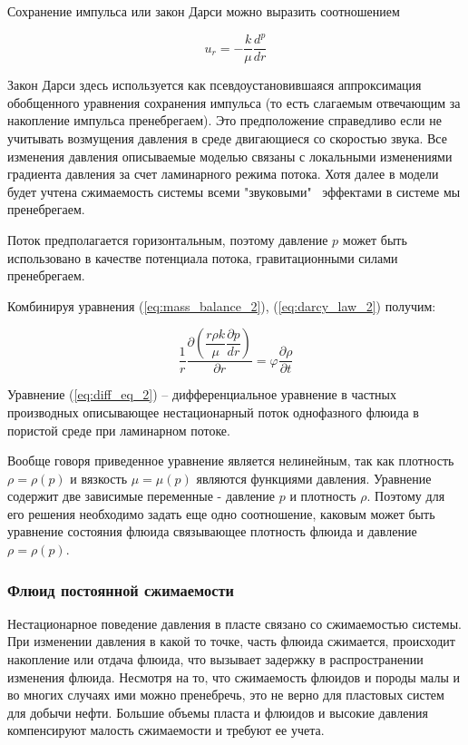 Сохранение импульса или закон Дарси можно выразить соотношением  


\begin{equation} \label{eq:darcy_law_2}
 u_r=-\frac{k}{\mu}\frac{d^p}{dr}
\end{equation}

Закон Дарси здесь используется как псевдоустановившаяся аппроксимация обобщенного уравнения сохранения импульса (то есть слагаемым отвечающим за накопление импульса пренебрегаем). Это предположение справедливо если не учитывать возмущения давления в среде двигающиеся со скоростью звука. Все изменения давления описываемые моделью связаны с локальными изменениями градиента давления за счет ламинарного режима потока. Хотя далее в модели будет учтена сжимаемость системы всеми "звуковыми" \ эффектами в системе мы пренебрегаем.

Поток предполагается горизонтальным, поэтому давление \( p\) может быть использовано в качестве потенциала потока, гравитационными силами пренебрегаем.

Комбинируя уравнения (\ref{eq:mass_balance_2}), (\ref{eq:darcy_law_2})  получим:

\begin{equation} \label{eq:diff_eq_2}
\frac{1}{r}\frac{\partial\left( \dfrac{r\rho k}{\mu}\dfrac{\partial p}{dr}\right)}{\partial r}=\varphi\frac{\partial \rho}{\partial t}
\end{equation}

Уравнение (\ref{eq:diff_eq_2}) -- дифференциальное уравнение в частных производных описывающее нестационарный поток однофазного флюида в пористой среде при ламинарном потоке. 

Вообще говоря приведенное уравнение является нелинейным, так как плотность $\rho = \rho(p)$ и вязкость $\mu = \mu(p)$ являются функциями давления. Уравнение содержит две зависимые переменные - давление $p$ и плотность $\rho$. Поэтому для его решения необходимо задать еще одно соотношение, каковым может быть уравнение состояния флюида связывающее плотность флюида и давление $\rho = \rho(p)$. 

\subsubsection{Флюид постоянной сжимаемости}
 
Нестационарное поведение давления в пласте связано со сжимаемостью системы. При изменении давления в какой то точке, часть флюида сжимается, происходит накопление или отдача флюида, что вызывает задержку в распространении изменения флюида. Несмотря на то, что сжимаемость флюидов и породы малы и во многих случаях ими можно пренебречь, это не верно для пластовых систем для добычи нефти. Большие объемы пласта и флюидов и высокие давления компенсируют малость сжимаемости и требуют ее учета. 

